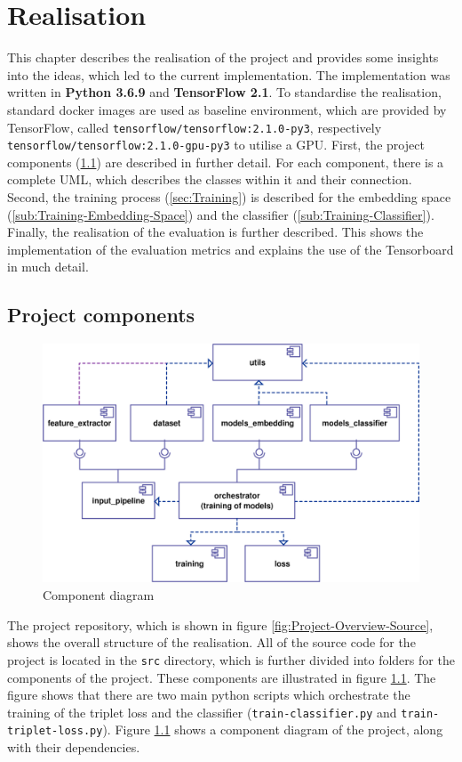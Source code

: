 \chapter{Realisation}
\label{ch:Realisation}
This chapter describes the realisation of the project and provides some insights into the ideas, which led to the current implementation. The implementation was written in \textbf{Python 3.6.9} and \textbf{TensorFlow 2.1}. To standardise the realisation, standard docker images are used as baseline environment, which are provided by TensorFlow, called \texttt{tensorflow/tensorflow:2.1.0-py3}, respectively \texttt{tensorflow/tensorflow:2.1.0-gpu-py3} to utilise a \gls{GPU}.
\newline
\newline
First, the project components (\ref{sec:Project-Components}) are described in further detail. For each component, there is a complete UML, which describes the classes within it and their connection. Second, the training process (\ref{sec:Training}) is described for the embedding space (\ref{sub:Training-Embedding-Space}) and the classifier (\ref{sub:Training-Classifier}). Finally, the realisation of the evaluation is further described. This shows the implementation of the evaluation metrics and explains the use of the Tensorboard in much detail.

\section{Project components}
\label{sec:Project-Components}
\begin{figure}[htb]
	\centering
	\includegraphics[width=0.6\linewidth]{img/Component_Diagram.png}
	\caption{Component diagram}
	\label{fig:Component-Diagram}
\end{figure}
\noindent
The project repository, which is shown in figure \ref{fig:Project-Overview-Source}, shows the overall structure of the realisation. All of the source code for the project is located in the \texttt{src} directory, which is further divided into folders for the components of the project. These components are illustrated in figure \ref{sec:Project-Components}. The figure shows that there are two main python scripts which orchestrate the training of the triplet loss and the classifier (\texttt{train-classifier.py} and \texttt{train-triplet-loss.py}). Figure \ref{fig:Component-Diagram} shows a component diagram of the project, along with their dependencies.

